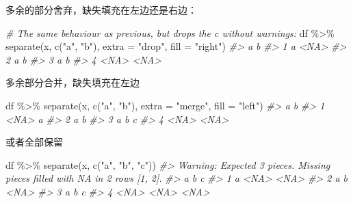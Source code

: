 \documentclass[
]{book}
\newenvironment{Shaded}{\begin{snugshade}}{\end{snugshade}}
\newcommand{\AttributeTok}[1]{\textcolor[rgb]{0.77,0.63,0.00}{#1}}
\newcommand{\CommentTok}[1]{\textcolor[rgb]{0.56,0.35,0.01}{\textit{#1}}}
\newcommand{\FunctionTok}[1]{\textcolor[rgb]{0.00,0.00,0.00}{#1}}
\newcommand{\NormalTok}[1]{#1}
\newcommand{\SpecialCharTok}[1]{\textcolor[rgb]{0.00,0.00,0.00}{#1}}
\newcommand{\StringTok}[1]{\textcolor[rgb]{0.31,0.60,0.02}{#1}}
\begin{document}
多余的部分舍弃，缺失填充在左边还是右边：

\begin{Shaded}
\begin{Highlighting}[]
\CommentTok{\# The same behaviour as previous, but drops the c without warnings:}
\NormalTok{df }\SpecialCharTok{\%\textgreater{}\%} \FunctionTok{separate}\NormalTok{(x, }\FunctionTok{c}\NormalTok{(}\StringTok{"a"}\NormalTok{, }\StringTok{"b"}\NormalTok{), }\AttributeTok{extra =} \StringTok{"drop"}\NormalTok{, }\AttributeTok{fill =} \StringTok{"right"}\NormalTok{)}
\CommentTok{\#\textgreater{}      a    b}
\CommentTok{\#\textgreater{} 1    a \textless{}NA\textgreater{}}
\CommentTok{\#\textgreater{} 2    a    b}
\CommentTok{\#\textgreater{} 3    a    b}
\CommentTok{\#\textgreater{} 4 \textless{}NA\textgreater{} \textless{}NA\textgreater{}}
\end{Highlighting}
\end{Shaded}

多余部分合并，缺失填充在左边

\begin{Shaded}
\begin{Highlighting}[]
\NormalTok{df }\SpecialCharTok{\%\textgreater{}\%} \FunctionTok{separate}\NormalTok{(x, }\FunctionTok{c}\NormalTok{(}\StringTok{"a"}\NormalTok{, }\StringTok{"b"}\NormalTok{), }\AttributeTok{extra =} \StringTok{"merge"}\NormalTok{, }\AttributeTok{fill =} \StringTok{"left"}\NormalTok{)}
\CommentTok{\#\textgreater{}      a    b}
\CommentTok{\#\textgreater{} 1 \textless{}NA\textgreater{}    a}
\CommentTok{\#\textgreater{} 2    a    b}
\CommentTok{\#\textgreater{} 3    a  b c}
\CommentTok{\#\textgreater{} 4 \textless{}NA\textgreater{} \textless{}NA\textgreater{}}
\end{Highlighting}
\end{Shaded}

或者全部保留

\begin{Shaded}
\begin{Highlighting}[]
\NormalTok{df }\SpecialCharTok{\%\textgreater{}\%} \FunctionTok{separate}\NormalTok{(x, }\FunctionTok{c}\NormalTok{(}\StringTok{"a"}\NormalTok{, }\StringTok{"b"}\NormalTok{, }\StringTok{"c"}\NormalTok{))}
\CommentTok{\#\textgreater{} Warning: Expected 3 pieces. Missing pieces filled with \textasciigrave{}NA\textasciigrave{} in 2 rows [1, 2].}
\CommentTok{\#\textgreater{}      a    b    c}
\CommentTok{\#\textgreater{} 1    a \textless{}NA\textgreater{} \textless{}NA\textgreater{}}
\CommentTok{\#\textgreater{} 2    a    b \textless{}NA\textgreater{}}
\CommentTok{\#\textgreater{} 3    a    b    c}
\CommentTok{\#\textgreater{} 4 \textless{}NA\textgreater{} \textless{}NA\textgreater{} \textless{}NA\textgreater{}}
\end{Highlighting}
\end{Shaded}
\end{document}
